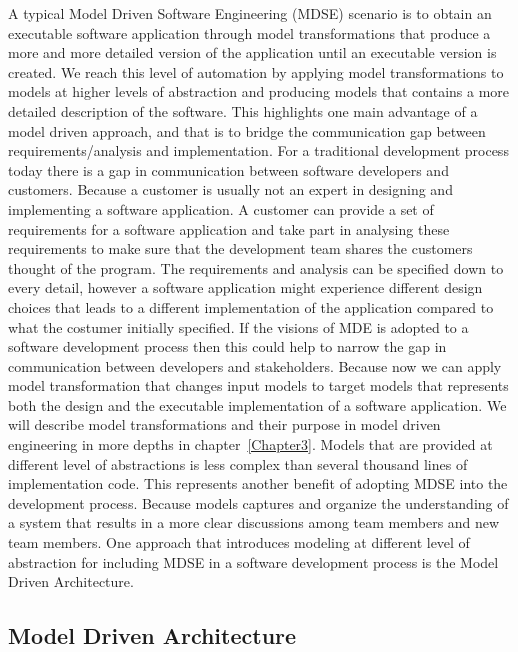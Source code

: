 A typical Model Driven Software Engineering (MDSE) scenario is to obtain an
executable software application through model transformations that produce a
more and more detailed version of the application until an executable version is
created. We reach this level of automation by applying model transformations to
models at higher levels of abstraction and producing models that contains a more
detailed description of the software. This highlights one main advantage of a
model driven approach, and that is to bridge the communication gap between
requirements/analysis and implementation\cite{Brown2008}. For a traditional
development process today there is a gap in communication between software
developers and customers\cite{France2007}. Because a customer is usually not an
expert in designing and implementing a software application. A customer can
provide a set of requirements for a software application and take part in
analysing these requirements to make sure that the development team shares the
customers thought of the program. The requirements and analysis can be
specified down to every detail, however a software application might experience
different design choices that leads to a different implementation of the
application compared to what the costumer initially specified. If the visions
of MDE is adopted to a software development process then this could help to
narrow the gap in communication between developers and stakeholders. Because
now we can apply model transformation that changes input models to target
models that represents both the design and the executable implementation of a
software application. We will describe model transformations and their purpose
in model driven engineering in more depths in chapter~\ref{Chapter3}. Models
that are provided at different level of abstractions is less complex than
several thousand lines of implementation code. This represents another benefit
of adopting MDSE into the development process. Because models captures and
organize the understanding of a system that results in a more clear discussions
among team members and new team members. One approach that introduces modeling
at different level of abstraction for including MDSE in a software development
process is the Model Driven Architecture.

\subsection{Model Driven Architecture}
\label{MDA}

